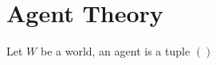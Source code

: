 \chapter{Agent Theory}


\begin{definition}
	Let $W$ be a world, an agent is a tuple $()$
\end{definition}